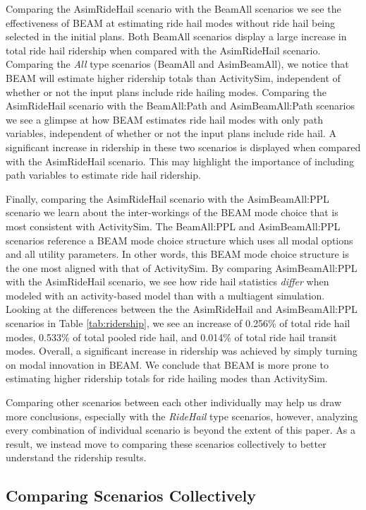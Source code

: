 \documentclass[12pt, oneside, openright]{byuthesis}
\begin{document}
Comparing the AsimRideHail scenario with the BeamAll scenarios we see the effectiveness of BEAM at estimating ride hail modes without ride hail being selected in the initial plans. Both BeamAll scenarios display a large increase in total ride hail ridership when compared with the AsimRideHail scenario. Comparing the \emph{All} type scenarios (BeamAll and AsimBeamAll), we notice that BEAM will estimate higher ridership totals than ActivitySim, independent of whether or not the input plans include ride hailing modes. Comparing the AsimRideHail scenario with the BeamAll:Path and AsimBeamAll:Path scenarios we see a glimpse at how BEAM estimates ride hail modes with only path variables, independent of whether or not the input plans include ride hail. A significant increase in ridership in these two scenarios is displayed when compared with the AsimRideHail scenario. This may highlight the importance of including path variables to estimate ride hail ridership.

Finally, comparing the AsimRideHail scenario with the AsimBeamAll:PPL scenario we learn about the inter-workings of the BEAM mode choice that is most consistent with ActivitySim. The BeamAll:PPL and AsimBeamAll:PPL scenarios reference a BEAM mode choice structure which uses all modal options and all utility parameters. In other words, this BEAM mode choice structure is the one most aligned with that of ActivitySim. By comparing AsimBeamAll:PPL with the AsimRideHail scenario, we see how ride hail statistics \emph{differ} when modeled with an activity-based model than with a multiagent simulation. Looking at the differences between the the AsimRideHail and AsimBeamAll:PPL scenarios in Table \ref{tab:ridership}, we see an increase of 0.256\% of total ride hail modes, 0.533\% of total pooled ride hail, and 0.014\% of total ride hail transit modes. Overall, a significant increase in ridership was achieved by simply turning on modal innovation in BEAM. We conclude that BEAM is more prone to estimating higher ridership totals for ride hailing modes than ActivitySim.

Comparing other scenarios between each other individually may help us draw more conclusions, especially with the \emph{RideHail} type scenarios, however, analyzing every combination of individual scenario is beyond the extent of this paper. As a result, we instead move to comparing these scenarios collectively to better understand the ridership results.

\hypertarget{res-col}{%
\subsection{Comparing Scenarios Collectively}\label{res-col}}
\end{document}
